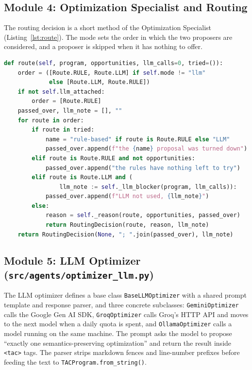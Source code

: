 \documentclass[12pt,a4paper]{report}
\begin{document}
\subsection{Module 4: Optimization Specialist and Routing}

The routing decision is a short method of the Optimization Specialist (Listing~\ref{lst:route}). The mode sets the order in which the two proposers are considered, and a proposer is skipped when it has nothing to offer.

\begin{lstlisting}[language=Python, caption={The routing decision (trimmed, from \texttt{optimization\_specialist.py})}, label=lst:route]
def route(self, program, opportunities, llm_calls=0, tried=()):
    order = ([Route.RULE, Route.LLM] if self.mode != "llm"
             else [Route.LLM, Route.RULE])
    if not self.llm_attached:
        order = [Route.RULE]
    passed_over, llm_note = [], ""
    for route in order:
        if route in tried:
            name = "rule-based" if route is Route.RULE else "LLM"
            passed_over.append(f"the {name} proposal was turned down")
        elif route is Route.RULE and not opportunities:
            passed_over.append("the rules have nothing left to try")
        elif route is Route.LLM and (
                llm_note := self._llm_blocker(program, llm_calls)):
            passed_over.append(f"LLM not used, {llm_note}")
        else:
            reason = self._reason(route, opportunities, passed_over)
            return RoutingDecision(route, reason, llm_note)
    return RoutingDecision(None, "; ".join(passed_over), llm_note)
\end{lstlisting}

\subsection{Module 5: LLM Optimizer (\texttt{src/agents/optimizer\_llm.py})}

The LLM optimizer defines a base class \texttt{BaseLLMOptimizer} with a shared prompt template and response parser, and three concrete subclasses: \texttt{GeminiOptimizer} calls the Google Gen AI SDK, \texttt{GroqOptimizer} calls Groq's HTTP API and moves to the next model when a daily quota is spent, and \texttt{OllamaOptimizer} calls a model running on the same machine. The prompt asks the model to propose ``exactly one semantics-preserving optimization'' and return the result inside \texttt{<tac>} tags. The parser strips markdown fences and line-number prefixes before feeding the text to \texttt{TACProgram.from\_string()}.
\end{document}

